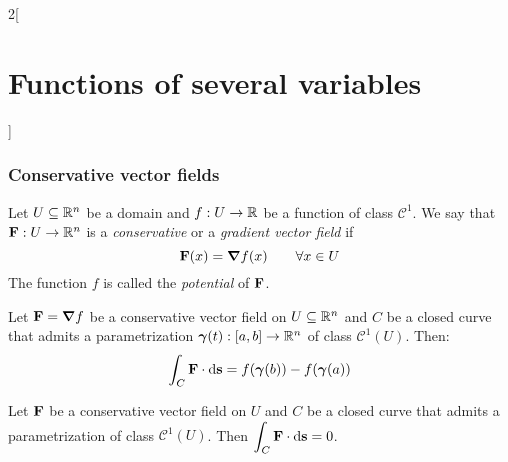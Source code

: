 \documentclass[../../../main.tex]{subfiles}
\begin{document}
\begin{multicols}{2}[\section{Functions of several variables}]
  \subsubsection{Conservative vector fields}
  \begin{definition}
    Let $U\subseteq\mathbb{R}^n$ be a domain and $f:U\rightarrow\mathbb{R} $ be a function of class $\mathcal{C}^1$. We say that $\boldsymbol{\mathrm{F}}:U\rightarrow\mathbb{R}^n$ is a \emph{conservative} or a \emph{gradient vector field} if $$\boldsymbol{\mathrm{F}}(x)=\grad f(x)\qquad \forall x\in U$$ The function $f$ is called the \emph{potential} of $\boldsymbol{\mathrm{F}}$.
  \end{definition}
  \begin{theorem}
    Let $\boldsymbol{\mathrm{F}}=\grad f$ be a conservative vector field on $U\subseteq\mathbb{R}^n$ and $C$ be a closed curve that admits a parametrization $\boldsymbol{\mathrm{\gamma}}(t):[a,b]\rightarrow\mathbb{R}^n$ of class $\mathcal{C}^1(U)$. Then: $$\int_C\boldsymbol{\mathrm{F}}\cdot \dd{\boldsymbol{\mathrm{s}}}=f(\boldsymbol{\mathrm{\gamma}}(b))-f(\boldsymbol{\mathrm{\gamma}}(a))$$
  \end{theorem}
  \begin{corollary}
    Let $\boldsymbol{\mathrm{F}}$ be a conservative vector field on $U$ and $C$ be a closed curve that admits a parametrization of class $\mathcal{C}^1(U)$. Then $\displaystyle\int_C\boldsymbol{\mathrm{F}}\cdot \dd{\boldsymbol{\mathrm{s}}}=0$.
  \end{corollary}

\end{multicols}
\end{document}
